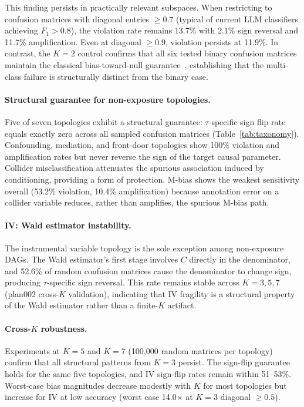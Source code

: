 This finding persists in practically relevant subspaces. When restricting to confusion matrices with diagonal entries $\geq 0.7$ (typical of current LLM classifiers achieving $F_1 > 0.8$), the violation rate remains 13.7\% with 2.1\% sign reversal and 11.7\% amplification. Even at diagonal $\geq 0.9$, violation persists at 11.9\%. In contrast, the $K{=}2$ control confirms that all six tested binary confusion matrices maintain the classical bias-toward-null guarantee~\cite{brenner1993}, establishing that the multi-class failure is structurally distinct from the binary case.

\paragraph{Structural guarantee for non-exposure topologies.}
Five of seven topologies exhibit a structural guarantee: $\tau$-specific sign flip rate equals exactly zero across all sampled confusion matrices (Table~\ref{tab:taxonomy}). Confounding, mediation, and front-door topologies show 100\% violation and amplification rates but never reverse the sign of the target causal parameter. Collider misclassification attenuates the spurious association induced by conditioning, providing a form of protection. M-bias shows the weakest sensitivity overall (53.2\% violation, 10.4\% amplification) because annotation error on a collider variable reduces, rather than amplifies, the spurious M-bias path.

\paragraph{IV: Wald estimator instability.}
The instrumental variable topology is the sole exception among non-exposure DAGs. The Wald estimator's first stage involves $C$ directly in the denominator, and 52.6\% of random confusion matrices cause the denominator to change sign, producing $\tau$-specific sign reversal. This rate remains stable across $K{=}3,5,7$ (plan002 cross-$K$ validation), indicating that IV fragility is a structural property of the Wald estimator rather than a finite-$K$ artifact.

\paragraph{Cross-$K$ robustness.}
Experiments at $K{=}5$ and $K{=}7$ (100{,}000 random matrices per topology) confirm that all structural patterns from $K{=}3$ persist. The sign-flip guarantee holds for the same five topologies, and IV sign-flip rates remain within 51--53\%. Worst-case bias magnitudes decrease modestly with $K$ for most topologies but increase for IV at low accuracy (worst case 14.0$\times$ at $K{=}3$ diagonal $\geq 0.5$).

